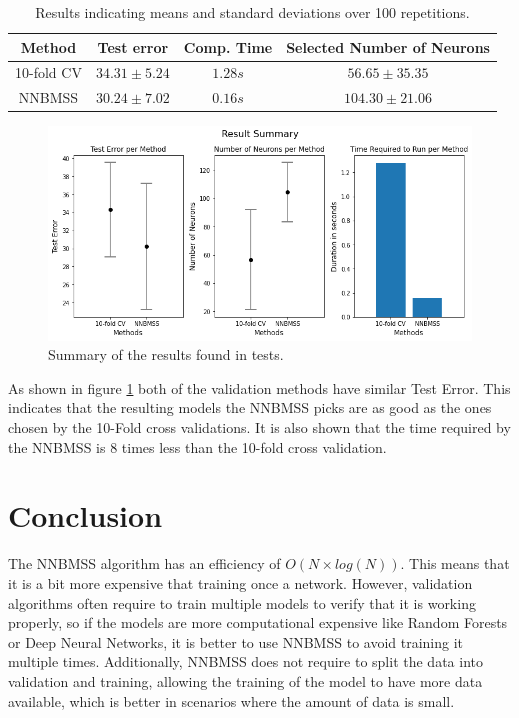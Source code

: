 \documentclass[a4paper]{article}
\begin{document}
\begin{table}[!h]
    \centering
    \begin{tabular}{|c||c|c|c|}
    \hline
         Method & Test error & Comp. Time & Selected Number of Neurons  \\ \hline
         10-fold CV & $34.31 \pm 5.24$ & $1.28s$ & $56.65 \pm 35.35$  \\ \hline
         NNBMSS & $30.24 \pm 7.02$ & $0.16s$ & $104.30 \pm 21.06$ \\ \hline
    \end{tabular}
    \caption{Results indicating means and standard deviations over 100 repetitions.}
    \label{tab:results}
\end{table}

\begin{figure}[htp]
    \centering
    \includegraphics[width=\textwidth]{results.png}
    \caption{Summary of the results found in tests. }
    \label{fig:results}
\end{figure}

As shown in figure \ref{fig:results} both of the validation methods have similar Test Error. This indicates that the resulting models the NNBMSS picks are as good as the ones chosen by the 10-Fold cross validations. It is also shown that the time required by the NNBMSS is 8 times less than the 10-fold cross validation.

\section{Conclusion}

The NNBMSS algorithm has an efficiency of $O(N\times log(N))$. This means that it is a bit more expensive that training once a network. However, validation algorithms often require to train multiple models to verify that it is working properly, so if the models are more computational expensive like Random Forests or Deep Neural Networks, it is better to use NNBMSS to avoid training it multiple times. Additionally, NNBMSS does not require to split the data into validation and training, allowing the training of the model to have more data available, which is better in scenarios where the amount of data is small. 

\printbibliography %
\end{document}
